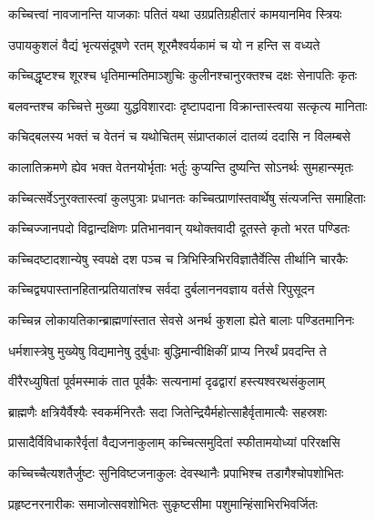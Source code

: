 \twolineshloka
{कच्चित्त्वां नावजानन्ति याजकाः पतितं यथा}
{उग्रप्रतिग्रहीतारं कामयानमिव स्त्रियः} %

\twolineshloka
{उपायकुशलं वैद्यं भृत्यसंदूषणे रतम्}
{शूरमैश्वर्यकामं च यो न हन्ति स वध्यते} %

\twolineshloka
{कच्चिद्धृष्टश्च शूरश्च धृतिमान्मतिमाञ्शुचिः}
{कुलीनश्चानुरक्तश्च दक्षः सेनापतिः कृतः} %

\twolineshloka
{बलवन्तश्च कच्चित्ते मुख्या युद्धविशारदाः}
{दृष्टापदाना विक्रान्तास्त्वया सत्कृत्य मानिताः} %

\twolineshloka
{कचिद्बलस्य भक्तं च वेतनं च यथोचितम्}
{संप्राप्तकालं दातव्यं ददासि न विलम्बसे} %

\twolineshloka
{कालातिक्रमणे ह्येव भक्त वेतनयोर्भृताः}
{भर्तुः कुप्यन्ति दुष्यन्ति सोऽनर्थः सुमहान्स्मृतः} %

\twolineshloka
{कच्चित्सर्वेऽनुरक्तास्त्वां कुलपुत्राः प्रधानतः}
{कच्चित्प्राणांस्तवार्थेषु संत्यजन्ति समाहिताः} %

\twolineshloka
{कच्चिज्जानपदो विद्वान्दक्षिणः प्रतिभानवान्}
{यथोक्तवादी दूतस्ते कृतो भरत पण्डितः} %

\twolineshloka
{कच्चिदष्टादशान्येषु स्वपक्षे दश पञ्च च}
{त्रिभिस्त्रिभिरविज्ञातैर्वेत्सि तीर्थानि चारकैः} %

\twolineshloka
{कच्चिद्व्यपास्तानहितान्प्रतियातांश्च सर्वदा}
{दुर्बलाननवज्ञाय वर्तसे रिपुसूदन} %

\twolineshloka
{कच्चिन्न लोकायतिकान्ब्राह्मणांस्तात सेवसे}
{अनर्थ कुशला ह्येते बालाः पण्डितमानिनः} %

\twolineshloka
{धर्मशास्त्रेषु मुख्येषु विद्यमानेषु दुर्बुधाः}
{बुद्धिमान्वीक्षिकीं प्राप्य निरर्थं प्रवदन्ति ते} %

\twolineshloka
{वीरैरध्युषितां पूर्वमस्माकं तात पूर्वकैः}
{सत्यनामां दृढद्वारां हस्त्यश्वरथसंकुलाम्} %

\twolineshloka
{ब्राह्मणैः क्षत्रियैर्वैश्यैः स्वकर्मनिरतैः सदा}
{जितेन्द्रियैर्महोत्साहैर्वृतामात्यैः सहस्रशः} %

\twolineshloka
{प्रासादैर्विविधाकारैर्वृतां वैद्यजनाकुलाम्}
{कच्चित्समुदितां स्फीतामयोध्यां परिरक्षसि} %

\twolineshloka
{कच्चिच्चैत्यशतैर्जुष्टः सुनिविष्टजनाकुलः}
{देवस्थानैः प्रपाभिश्च तडागैश्चोपशोभितः} %

\twolineshloka
{प्रहृष्टनरनारीकः समाजोत्सवशोभितः}
{सुकृष्टसीमा पशुमान्हिंसाभिरभिवर्जितः} %

